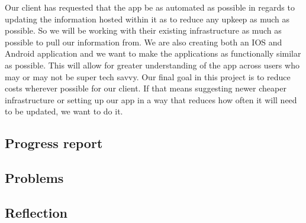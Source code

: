 \documentclass[letterpaper,10pt,draftclsnofoot,onecolumn,titlepage]{IEEEtran}
\begin{document}
	Our client has requested that the app be as automated as possible in regards to updating the information hosted within it as to reduce any upkeep as much as possible. 
	So we will be working with their existing infrastructure as much as possible to pull our information from. 
	We are also creating both an IOS and Android application and we want to make the applications as functionally similar as possible. 
	This will allow for greater understanding of the app across users who may or may not be super tech savvy. 
	Our final goal in this project is to reduce costs wherever possible for our client. 
	If that means suggesting newer cheaper infrastructure or setting up our app in a way that reduces how often it will need to be updated, we want to do it. 

		
		\subsection{Progress report}

		\subsection{Problems}

		\subsection{Reflection}

		
		
		
\end{document}
